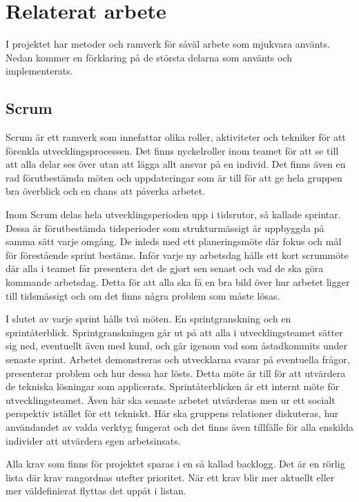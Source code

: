 \chapter{Relaterat arbete}
I projektet har metoder och ramverk för såväl arbete som mjukvara använts. Nedan kommer en förklaring på de största delarna som använts och implementerats.

\section{Scrum}
Scrum är ett ramverk som innefattar olika roller, aktiviteter och tekniker för att förenkla utvecklingsprocessen. Det finns nyckelroller inom teamet för att se till att alla delar ses över utan att lägga allt ansvar på en individ. Det finns även en rad förutbestämda möten och uppdateringar som är till för att ge hela gruppen bra överblick och en chans att påverka arbetet.

Inom Scrum delas hela utvecklingsperioden upp i tidsrutor, så kallade sprintar. Dessa är förutbestämda tidsperioder som strukturmässigt är uppbyggda på samma sätt varje omgång. De inleds med ett planeringsmöte där fokus och mål för förestående sprint bestäms. Inför varje ny arbetsdag hålls ett kort scrummöte där alla i teamet får presentera det de gjort sen senast och vad de ska göra kommande arbetsdag. Detta för att alla ska få en bra bild över hur arbetet ligger till tidsmässigt och om det finns några problem som måste lösas.

I slutet av varje sprint hålls två möten. En sprintgranskning och en sprintåterblick. Sprintgranskningen går ut på att alla i utvecklingsteamet sätter sig ned, eventuellt även med kund, och går igenom vad som åstadkommits under senaste sprint. Arbetet demonstreras och utvecklarna svarar på eventuella frågor, presenterar problem och hur dessa har lösts. Detta möte är till för att utvärdera de tekniska lösningar som applicerats. Sprintåterblicken är ett internt möte för utvecklingsteamet. Även här ska senaste arbetet utvärderas men ur ett socialt perspektiv istället för ett tekniskt. Här ska gruppens relationer diskuteras, hur användandet av valda verktyg fungerat och det finns även tillfälle för alla enskilda individer att utvärdera egen arbetsinsats.

Alla krav som finns för projektet sparas i en så kallad backlogg. Det är en rörlig lista där krav rangordnas utefter prioritet. När ett krav blir mer aktuellt eller mer väldefinierat flyttas det uppåt i listan. \cite{scrumguide}


